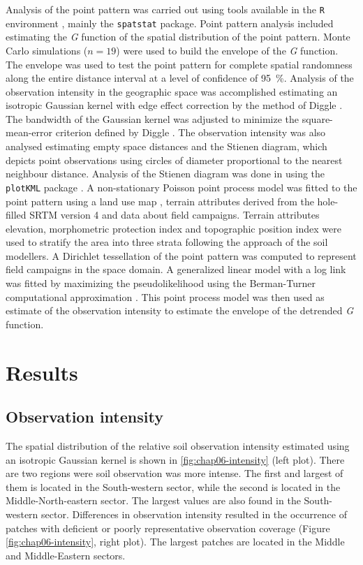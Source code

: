 Analysis of the point pattern was carried out using tools available in the \texttt{R} environment 
\cite{R2013}, mainly the \texttt{spatstat} \cite{Baddeley2010} package. Point pattern analysis included 
estimating the \emph{G} function of the spatial distribution of the point pattern. Monte Carlo simulations ($n 
= 19$) were used to build the envelope of the \emph{G} function. The envelope was used to test the point 
pattern for complete spatial randomness along the entire distance interval at a level of confidence of 
\SI{95}{\percent}. Analysis of the observation intensity in the geographic space was accomplished estimating an 
isotropic Gaussian kernel with edge effect correction by the method of Diggle \cite{Diggle1985}. The bandwidth 
of the Gaussian kernel was adjusted to minimize the square-mean-error criterion defined by Diggle 
\cite{Diggle1985}. The observation intensity was also analysed estimating empty space distances and the Stienen 
diagram, which depicts point observations using circles of diameter proportional to the nearest neighbour 
distance. Analysis of the Stienen diagram was done in \googleearth{} using the \texttt{plotKML} package 
\cite{Hengl2013}. A non-stationary Poisson point process model was fitted to the point pattern using a land use 
map \cite{SamuelRosaEtAl2011a}, terrain attributes derived from the hole-filled SRTM version \num{4} 
\cite{ReuterEtAl2007,Jarvis2008} and data about field campaigns. Terrain attributes elevation, morphometric 
protection index and topographic position index were used to stratify the area into three strata following the 
approach of the soil modellers. A Dirichlet tessellation of the point pattern was computed to represent field 
campaigns in the space domain. A generalized linear model with a log link was fitted by maximizing the 
pseudolikelihood using the Berman-Turner computational approximation \cite{Baddeley2010}. This point process 
model was then used as estimate of the observation intensity to estimate the envelope of the detrended \emph{G} 
function.

\section{Results}
\label{sec:chap06-results}

\subsection{Observation intensity}

The spatial distribution of the relative soil observation intensity estimated using an isotropic Gaussian 
kernel is shown in \autoref{fig:chap06-intensity} (left plot). There are two regions were soil observation was 
more intense. The first and largest of them is located in the South-western sector, while the second is 
located in the Middle-North-eastern sector. The largest values are also found in the South-western sector. 
Differences in observation intensity resulted in the occurrence of patches with deficient or poorly 
representative observation coverage (Figure \ref{fig:chap06-intensity}, right plot). The largest patches are 
located in the Middle and Middle-Eastern sectors.

